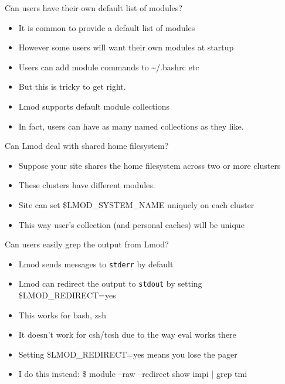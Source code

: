 \documentclass{beamer}
\begin{document}
\begin{frame}{Can users have their own default list of modules?}
  \begin{itemize}
    \item It is common to provide a default list of modules
    \item However some users will want their own modules at startup
    \item Users can add module commands to \textasciitilde/.bashrc etc
    \item But this is tricky to get right.
    \item Lmod supports default module collections
    \item In fact, users can have as many named collections as they like.
  \end{itemize}
\end{frame}


\begin{frame}{Can Lmod deal with shared home filesystem?}
  \begin{itemize}
    \item Suppose your site shares the home filesystem across two or
      more clusters
    \item These clusters have different modules.
    \item Site can set \$LMOD\_SYSTEM\_NAME uniquely on each cluster
    \item This way user's collection (and personal caches) will be
      unique
  \end{itemize}
\end{frame}

\begin{frame}{Can users easily grep the output from Lmod?}
  \begin{itemize}
    \item Lmod sends messages to \texttt{stderr} by default
    \item Lmod can redirect the output to \texttt{stdout} by setting
      \$LMOD\_REDIRECT=yes
    \item This works for bash, zsh
    \item It doesn't work for csh/tcsh due to the way eval works there
    \item Setting \$LMOD\_REDIRECT=yes means you lose the pager
    \item I do this instead: \$ module --raw --redirect show impi |
      grep tmi
  \end{itemize}
\end{frame}
\end{document}
